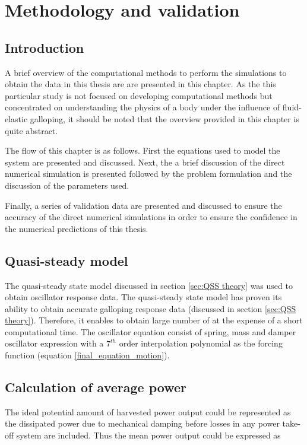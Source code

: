 \chapter{Methodology and validation}

\section{Introduction}
 
A brief overview of the computational methods to perform the simulations to obtain the data in this thesis are are presented in this chapter. As the this particular study is not focused on developing computational methods but concentrated on understanding the physics of a body under the influence of fluid-elastic galloping, it should be noted that the overview provided in this chapter is quite abstract.

The flow of this chapter is as follows. First the equations used to model the system are presented and discussed. Next, the a brief discussion of the direct numerical simulation is presented followed by the problem formulation and the discussion of the parameters used. 

Finally, a series of validation data are presented and discussed to ensure the accuracy of the direct numerical simulations in order to ensure the confidence in the numerical predictions of this thesis.

\section{Quasi-steady model}
\label{sec:QSS_model_methodology}

The quasi-steady state model discussed in section \ref{sec:QSS theory} was used to obtain oscillator response data. The quasi-steady state model has proven its ability to obtain accurate galloping response data (discussed in section \ref{sec:QSS theory}). Therefore, it enables to obtain large number of at the expense of a short computational time. The oscillator equation consist of spring, mass and damper oscillator expression with a $7^{th}$ order interpolation polynomial as the forcing function (equation \ref{final_equation_motion}).

\section{Calculation of average power}

The ideal potential amount of harvested power output could be represented as the dissipated power due to mechanical damping before losses in any power take-off system are included. Thus the mean power output could be expressed as 


